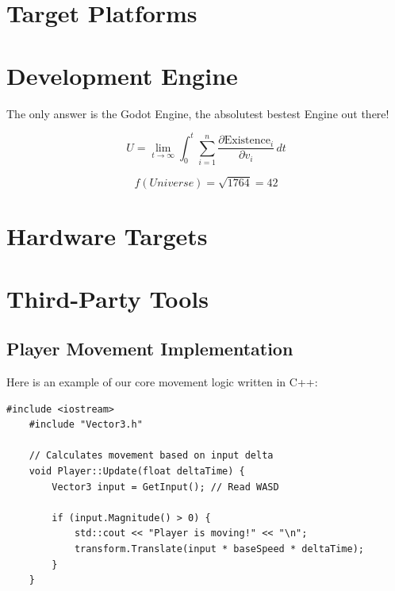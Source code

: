 \section{Target Platforms}

\lipsum[24]

\section{Development Engine}

The only answer is the Godot Engine, the absolutest bestest Engine out there!

\lipsum[25]

$$ U = \lim_{t \to \infty} \int_{0}^{t} \sum_{i=1}^{n} \frac{\partial \text{Existence}_i}{\partial v_i} \, dt $$

\begin{equation}
	f(Universe) = \sqrt{1764} = 42
\end{equation}

\section{Hardware Targets}

\lipsum[26]

\section{Third-Party Tools}

\lipsum[27]

\subsection{Player Movement Implementation}

Here is an example of our core movement logic written in C++:

\begin{lstlisting}[caption=PlayerController.cpp]
	#include <iostream>
	#include "Vector3.h"
	
	// Calculates movement based on input delta
	void Player::Update(float deltaTime) {
		Vector3 input = GetInput(); // Read WASD
		
		if (input.Magnitude() > 0) {
			std::cout << "Player is moving!" << "\n";
			transform.Translate(input * baseSpeed * deltaTime);
		}
	}
\end{lstlisting}